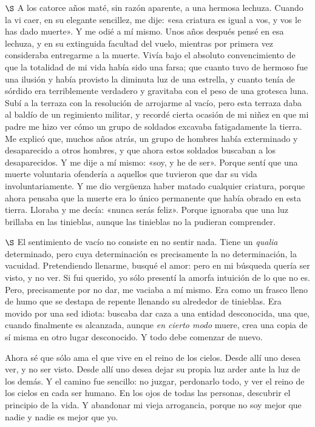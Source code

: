 \documentclass[a4paper, 12pt]{article}
\begin{document}
\pagebreak
$\S$ A los catorce años maté, sin razón aparente, a una hermosa lechuza.
Cuando la vi caer, en su elegante sencillez, me dije: «esa criatura es igual a
vos, y vos le has dado muerte». Y me odié a mí mismo. Unos años después pensé en
esa lechuza, y en su extinguida facultad del vuelo, mientras por primera vez
consideraba entregarme a la muerte. Vivía bajo el absoluto convencimiento de que
la totalidad de mi vida había sido una farsa; que cuanto tuvo de hermoso fue una
ilusión y había provisto la diminuta luz de una estrella, y cuanto tenía de
sórdido era terriblemente verdadero y gravitaba con el peso de una grotesca
luna. Subí a la terraza con la resolución de arrojarme al vacío, pero esta
terraza daba al baldío de un regimiento militar, y recordé cierta ocasión de mi
niñez en que mi padre me hizo ver cómo un grupo de soldados excavaba
fatigadamente la tierra. Me explicó que, muchos años atrás, un grupo de hombres
había exterminado y desaparecido a otros hombres, y que ahora estos soldados
buscaban a los desaparecidos. Y me dije a mí mismo: «soy, y he de ser». Porque
sentí que una muerte voluntaria ofendería a aquellos que tuvieron que dar su
vida involuntariamente. Y me dio vergüenza haber matado cualquier criatura,
porque ahora pensaba que la muerte era lo único permanente que había obrado en
esta tierra. Lloraba y me decía: «nunca serás feliz». Porque ignoraba que una luz
brillaba en las tinieblas, aunque las tinieblas no la pudieran comprender.

\pagebreak

$\S$ El sentimiento de vacío no consiste en no sentir nada. Tiene un
\textit{qualia} determinado, pero cuya determinación es precisamente la no
determinación, la vacuidad. Pretendiendo llenarme, busqué el amor:
pero en mi búsqueda quería ser visto, y no ver. Si fui querido, yo sólo presentí
la amorfa intuición de lo que no es. Pero, precisamente por no dar, me vaciaba a
mí mismo. Era como un frasco lleno de humo que se destapa de repente llenando su
alrededor de tinieblas. Era movido por una sed idiota: buscaba dar caza a una
entidad desconocida, una que, cuando finalmente es alcanzada, aunque \textit{en
cierto modo} muere, crea una copia de sí misma en otro lugar desconocido. Y todo
debe comenzar de nuevo.

Ahora sé que sólo ama el que vive en el reino de los cielos. Desde allí uno
desea ver, y no ser visto. Desde allí uno desea dejar su propia luz arder ante
la luz de los demás. Y el camino fue sencillo: no juzgar, perdonarlo todo, y ver
el reino de los cielos en cada ser humano. En los ojos de todas las personas,
descubrir el principio de la vida. Y abandonar mi vieja arrogancia, porque no
soy mejor que nadie y nadie es mejor que yo. 
\end{document}
